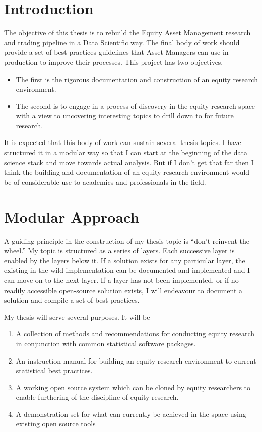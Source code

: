 \documentclass[11pt,preprint, authoryear]{elsarticle}
\numberwithin{equation}{section}
\numberwithin{figure}{section}
\numberwithin{table}{section}
\def\tightlist{} %
\begin{document}
\section{Introduction}\label{introduction}

The objective of this thesis is to rebuild the Equity Asset Management
research and trading pipeline in a Data Scientific way. The final body
of work should provide a set of best practices guidelines that Asset
Managers can use in production to improve their processes. This project
has two objectives.

\begin{itemize}
\tightlist
\item
  The first is the rigorous documentation and construction of an equity
  research environment.
\item
  The second is to engage in a process of discovery in the equity
  research space with a view to uncovering interesting topics to drill
  down to for future research.
\end{itemize}

It is expected that this body of work can sustain several thesis topics.
I have structured it in a modular way so that I can start at the
beginning of the data science stack and move towards actual analysis.
But if I don't get that far then I think the building and documentation
of an equity research environment would be of considerable use to
academics and professionals in the field.

\section{Modular Approach}\label{modular-approach}

A guiding principle in the construction of my thesis topic is ``don't
reinvent the wheel.'' My topic is structured as a series of layers. Each
successive layer is enabled by the layers below it. If a solution exists
for any particular layer, the existing in-the-wild implementation can be
documented and implemented and I can move on to the next layer. If a
layer has not been implemented, or if no readily accessible open-source
solution exists, I will endeavour to document a solution and compile a
set of best practices.

My thesis will serve several purposes. It will be -

\begin{enumerate}
\def\labelenumi{\arabic{enumi}.}
\tightlist
\item
  A collection of methods and recommendations for conducting equity
  research in conjunction with common statistical software packages.
\item
  An instruction manual for building an equity research environment to
  current statistical best practices.
\item
  A working open source system which can be cloned by equity researchers
  to enable furthering of the discipline of equity research.
\item
  A demonstration set for what can currently be achieved in the space
  using existing open source tools
\end{enumerate}
\end{document}
